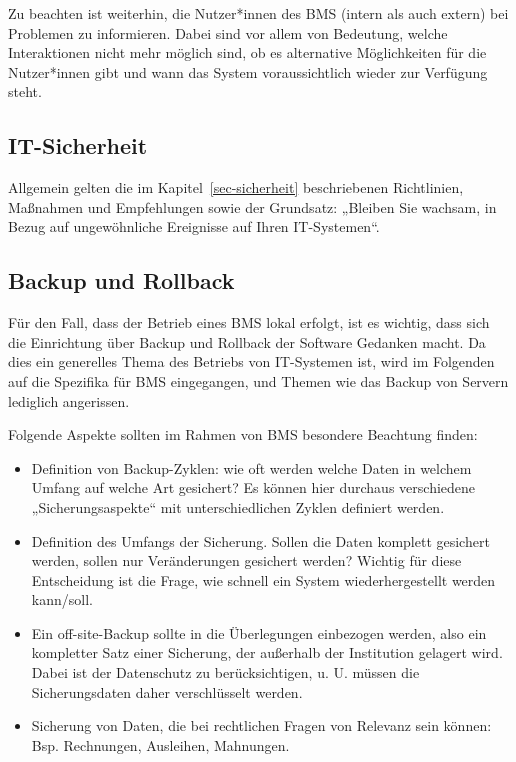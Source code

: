 \documentclass[
  11pt,
  letterpaper,
  DIV=11,
  twoside]{scrreprt}
\begin{document}
Zu beachten ist weiterhin, die Nutzer*innen des BMS (intern als auch
extern) bei Problemen zu informieren. Dabei sind vor allem von
Bedeutung, welche Interaktionen nicht mehr möglich sind, ob es
alternative Möglichkeiten für die Nutzer*innen gibt und wann das System
voraussichtlich wieder zur Verfügung steht.

\subsection{IT-Sicherheit}\label{it-sicherheit-1}

Allgemein gelten die im Kapitel~\ref{sec-sicherheit} beschriebenen
Richtlinien, Maßnahmen und Empfehlungen sowie der Grundsatz: „Bleiben
Sie wachsam, in Bezug auf ungewöhnliche Ereignisse auf Ihren
IT-Systemen``.

\subsection{Backup und Rollback}\label{backup-und-rollback}

Für den Fall, dass der Betrieb eines BMS lokal erfolgt, ist es wichtig,
dass sich die Einrichtung über Backup und Rollback der Software Gedanken
macht. Da dies ein generelles Thema des Betriebs von IT-Systemen ist,
wird im Folgenden auf die Spezifika für BMS eingegangen, und Themen wie
das Backup von Servern lediglich angerissen.

Folgende Aspekte sollten im Rahmen von BMS besondere Beachtung finden:

\begin{itemize}
\item
  Definition von Backup-Zyklen: wie oft werden welche Daten in welchem
  Umfang auf welche Art gesichert? Es können hier durchaus verschiedene
  „Sicherungsaspekte`` mit unterschiedlichen Zyklen definiert werden.
\item
  Definition des Umfangs der Sicherung. Sollen die Daten komplett
  gesichert werden, sollen nur Veränderungen gesichert werden? Wichtig
  für diese Entscheidung ist die Frage, wie schnell ein System
  wiederhergestellt werden kann/soll.
\item
  Ein off-site-Backup sollte in die Überlegungen einbezogen werden, also
  ein kompletter Satz einer Sicherung, der außerhalb der Institution
  gelagert wird. Dabei ist der Datenschutz zu berücksichtigen, u. U.
  müssen die Sicherungsdaten daher verschlüsselt werden.
\item
  Sicherung von Daten, die bei rechtlichen Fragen von Relevanz sein
  können: Bsp. Rechnungen, Ausleihen, Mahnungen.
\end{itemize}
\end{document}
